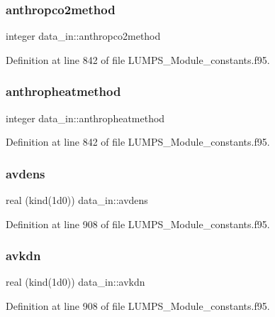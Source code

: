 \subsubsection{\texorpdfstring{anthropco2method}{anthropco2method}}
{\footnotesize\ttfamily integer data\+\_\+in\+::anthropco2method}



Definition at line 842 of file L\+U\+M\+P\+S\+\_\+\+Module\+\_\+constants.\+f95.

\mbox{\label{namespacedata__in_a2d5ce0a221d7ee5c42ab2bdb3bf06a8b}} 
\subsubsection{\texorpdfstring{anthropheatmethod}{anthropheatmethod}}
{\footnotesize\ttfamily integer data\+\_\+in\+::anthropheatmethod}



Definition at line 842 of file L\+U\+M\+P\+S\+\_\+\+Module\+\_\+constants.\+f95.

\mbox{\label{namespacedata__in_abf271c3057b02dd9183e4442954c9577}} 
\subsubsection{\texorpdfstring{avdens}{avdens}}
{\footnotesize\ttfamily real (kind(1d0)) data\+\_\+in\+::avdens}



Definition at line 908 of file L\+U\+M\+P\+S\+\_\+\+Module\+\_\+constants.\+f95.

\mbox{\label{namespacedata__in_a8ac4d9de71d52d8c39e04c59635a5e3c}} 
\subsubsection{\texorpdfstring{avkdn}{avkdn}}
{\footnotesize\ttfamily real (kind(1d0)) data\+\_\+in\+::avkdn}



Definition at line 908 of file L\+U\+M\+P\+S\+\_\+\+Module\+\_\+constants.\+f95.

